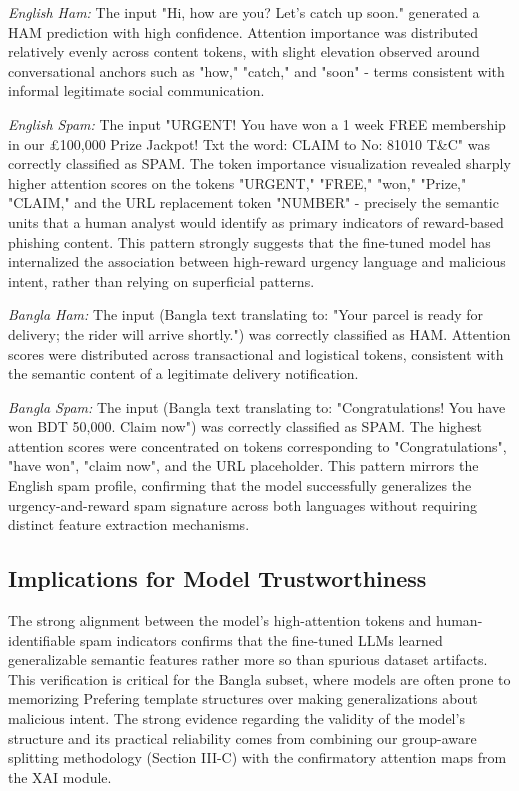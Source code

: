\documentclass[journal]{IEEEtran}
\begin{document}
\textit{English Ham:} The input "Hi, how are you? Let's catch up soon."
generated a HAM prediction with high confidence. Attention importance
was distributed relatively evenly across content tokens, with slight
elevation observed around conversational anchors such as "how," "catch,"
and "soon" - terms consistent with informal legitimate social
communication.

\textit{English Spam:} The input "URGENT! You have won a 1 week FREE
membership in our \pounds 100,000 Prize Jackpot! Txt the word: CLAIM to No:
81010 T\&C" was correctly classified as SPAM. The token importance
visualization revealed sharply higher attention scores on the tokens
"URGENT," "FREE," "won," "Prize," "CLAIM," and the URL replacement token
"NUMBER" - precisely the semantic units that a human analyst would
identify as primary indicators of reward-based phishing content. This
pattern strongly suggests that the fine-tuned model has internalized the
association between high-reward urgency language and malicious intent,
rather than relying on superficial patterns.

\textit{Bangla Ham:} The input (Bangla text translating to: "Your parcel is ready for delivery; the rider will arrive shortly.") was correctly classified as HAM. Attention scores were distributed across transactional and logistical tokens, consistent with the semantic content of a legitimate delivery notification.

\textit{Bangla Spam:} The input (Bangla text translating to: "Congratulations! You have won BDT 50,000. Claim now") was correctly classified as SPAM. The highest attention scores were concentrated on tokens corresponding to "Congratulations", "have won", "claim now", and the URL placeholder. This pattern mirrors the English spam profile, confirming that the model successfully generalizes the urgency-and-reward spam signature across both languages without requiring distinct feature extraction mechanisms.


\subsection{Implications for Model Trustworthiness}

The strong alignment between the model’s high-attention
tokens and human-identifiable spam indicators confirms that the
fine-tuned LLMs learned generalizable semantic features rather
more so than spurious dataset artifacts. This verification is critical for the
Bangla subset, where models are often prone to memorizing
Prefering template structures over making generalizations about malicious intent. The strong evidence regarding the validity of the model's structure and its practical reliability comes from combining our group-aware splitting methodology (Section III-C) with the confirmatory attention maps from the XAI module.
\end{document}
